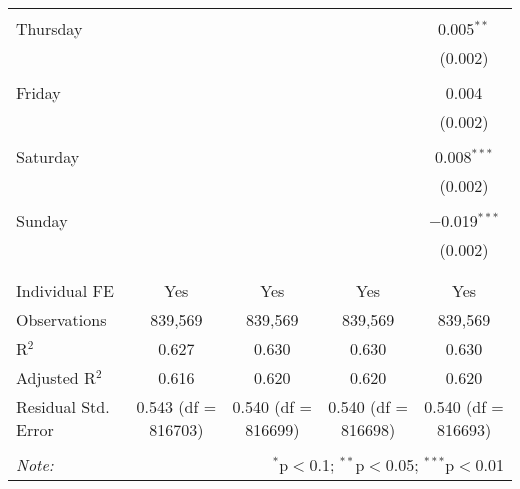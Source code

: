 \documentclass[
]{article}
\begin{document}
\begin{table}[!htbp]
{\begin{tabular}{@{\extracolsep{5pt}}lcccc}
  & & & & \\ 
 Thursday &  &  &  & 0.005$^{**}$ \\ 
  &  &  &  & (0.002) \\ 
  & & & & \\ 
 Friday &  &  &  & 0.004 \\ 
  &  &  &  & (0.002) \\ 
  & & & & \\ 
 Saturday &  &  &  & 0.008$^{***}$ \\ 
  &  &  &  & (0.002) \\ 
  & & & & \\ 
 Sunday &  &  &  & $-$0.019$^{***}$ \\ 
  &  &  &  & (0.002) \\ 
  & & & & \\ 
\hline \\[-1.8ex] 
Individual FE & Yes & Yes & Yes & Yes \\ 
Observations & 839,569 & 839,569 & 839,569 & 839,569 \\ 
R$^{2}$ & 0.627 & 0.630 & 0.630 & 0.630 \\ 
Adjusted R$^{2}$ & 0.616 & 0.620 & 0.620 & 0.620 \\ 
Residual Std. Error & 0.543 (df = 816703) & 0.540 (df = 816699) & 0.540 (df = 816698) & 0.540 (df = 816693) \\ 
\hline 
\hline \\[-1.8ex] 
\textit{Note:}  & \multicolumn{4}{r}{$^{*}$p$<$0.1; $^{**}$p$<$0.05; $^{***}$p$<$0.01} \\ 
\end{tabular}
} 
\end{table} 
\newpage
\end{document}
